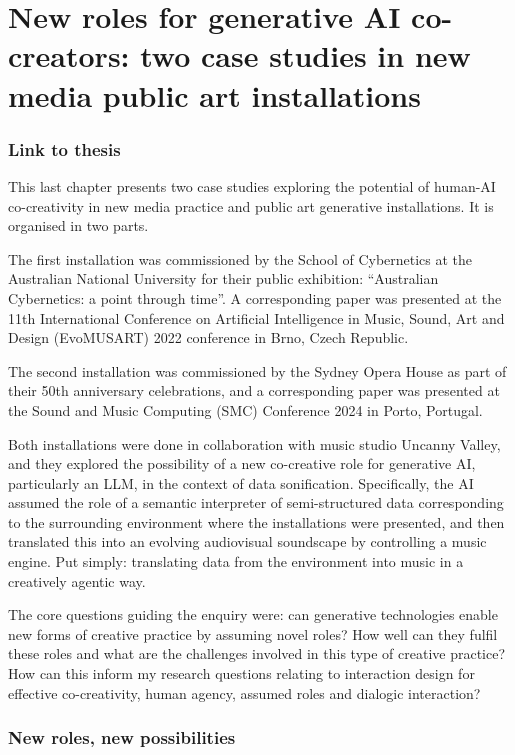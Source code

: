 \chapter[Artificial Intelligence as a Co-Creator in New Creative Practices]{New roles for generative AI co-creators: two case studies in new media public art installations}

\subsection{Link to thesis}
This last chapter presents two case studies exploring the potential of human-AI co-creativity in new media practice and public art generative installations. It is organised in two parts.

The first installation was commissioned by the School of Cybernetics at the Australian National University for their public exhibition: “Australian Cybernetics: a point through time”. A corresponding paper was presented at the 11th International Conference on Artificial Intelligence in Music, Sound, Art and Design (EvoMUSART) 2022 conference in Brno, Czech Republic.

The second installation was commissioned by the Sydney Opera House as part of their 50th anniversary celebrations, and a corresponding paper was presented at the Sound and Music Computing (SMC) Conference 2024 in Porto, Portugal.

Both installations were done in collaboration with music studio Uncanny Valley, and they explored the possibility of a new co-creative role for generative AI, particularly an LLM, in the context of data sonification. Specifically, the AI assumed the role of a semantic interpreter of semi-structured data corresponding to the surrounding environment where the installations were presented, and then translated this into an evolving audiovisual soundscape by controlling a music engine. Put simply: translating data from the environment into music in a creatively agentic way.

The core questions guiding the enquiry were: can generative technologies enable new forms of creative practice by assuming novel roles? How well can they fulfil these roles and what are the challenges involved in this type of creative practice? How can this inform my research questions relating to interaction design for effective co-creativity, human agency, assumed roles and dialogic interaction?

\subsection{New roles, new possibilities}

